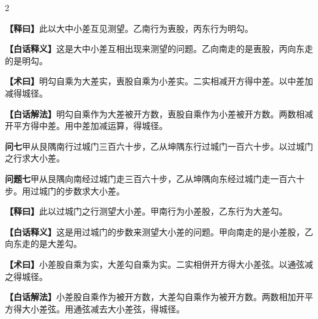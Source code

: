 \documentclass[11pt,a4paper]{article}
\newcommand{\WenQuestion}[1]{\textbf{\textcolor{classicalcolor}{#1}}}
\newcommand{\BaiQuestion}[1]{\textbf{\textcolor{moderncolor}{#1}}}
\newcommand{\WenExplain}{\textcolor{classicalcolor}{\textbf{【释曰】}}}
\newcommand{\BaiExplain}{\textcolor{moderncolor}{\textbf{【白话释义】}}}
\newcommand{\WenMethod}{\textcolor{classicalcolor}{\textbf{【术曰】}}}
\newcommand{\BaiMethod}{\textcolor{moderncolor}{\textbf{【白话解法】}}}
\begin{document}
\begin{paracol}{2}
\switchcolumn*
\begin{tcolorbox}[colback=red!5,colframe=red!30!black,boxrule=0.3pt]
\WenExplain\quad 此以大中小差互见测望。乙南行为叀股，丙东行为明勾。
\end{tcolorbox}
\switchcolumn
\begin{tcolorbox}[colback=blue!5,colframe=blue!30!black,boxrule=0.3pt]
\BaiExplain\quad 这是大中小差互相出现来测望的问题。乙向南走的是叀股，丙向东走的是明勾。
\end{tcolorbox}

\switchcolumn*
\begin{tcolorbox}[colback=red!5,colframe=red!40!black,boxrule=0.3pt]
\WenMethod\quad 明勾自乘为大差实，叀股自乘为小差实。二实相减开方得中差。以中差加减得城径。
\end{tcolorbox}
\switchcolumn
\begin{tcolorbox}[colback=blue!5,colframe=blue!40!black,boxrule=0.3pt]
\BaiMethod\quad 明勾自乘作为大差被开方数，叀股自乘作为小差被开方数。两数相减开平方得中差。用中差加减运算，得城径。
\end{tcolorbox}

\vspace{0.8em}

\switchcolumn*
\begin{tcolorbox}[colback=red!3,colframe=red!30!black,boxrule=0.3pt]
\WenQuestion{问七}\quad 甲从艮隅南行过城门三百六十步，乙从坤隅东行过城门一百六十步。以过城门之行求大小差。
\end{tcolorbox}
\switchcolumn
\begin{tcolorbox}[colback=blue!3,colframe=blue!30!black,boxrule=0.3pt]
\BaiQuestion{问题七}\quad 甲从艮隅向南经过城门走三百六十步，乙从坤隅向东经过城门走一百六十步。用过城门的步数求大小差。
\end{tcolorbox}

\switchcolumn*
\begin{tcolorbox}[colback=red!5,colframe=red!30!black,boxrule=0.3pt]
\WenExplain\quad 此以过城门之行测望大小差。甲南行为小差股，乙东行为大差勾。
\end{tcolorbox}
\switchcolumn
\begin{tcolorbox}[colback=blue!5,colframe=blue!30!black,boxrule=0.3pt]
\BaiExplain\quad 这是用过城门的步数来测望大小差的问题。甲向南走的是小差股，乙向东走的是大差勾。
\end{tcolorbox}

\switchcolumn*
\begin{tcolorbox}[colback=red!5,colframe=red!40!black,boxrule=0.3pt]
\WenMethod\quad 小差股自乘为实，大差勾自乘为实。二实相併开方得大小差弦。以通弦减之得城径。
\end{tcolorbox}
\switchcolumn
\begin{tcolorbox}[colback=blue!5,colframe=blue!40!black,boxrule=0.3pt]
\BaiMethod\quad 小差股自乘作为被开方数，大差勾自乘作为被开方数。两数相加开平方得大小差弦。用通弦减去大小差弦，得城径。
\end{tcolorbox}

\end{paracol}
\end{document}
